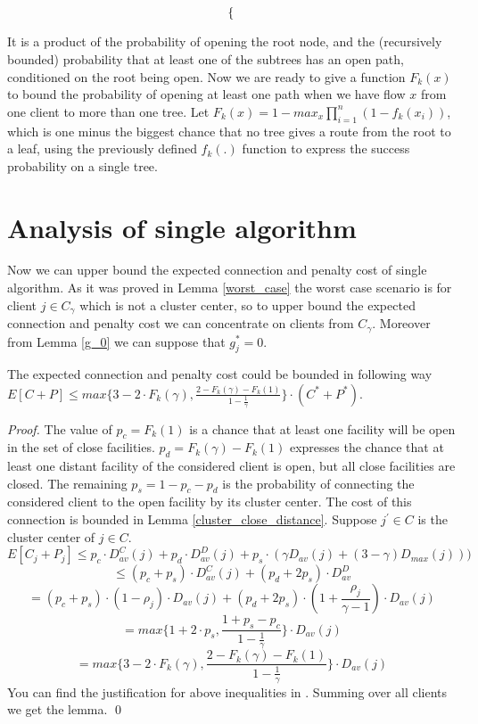\documentclass{llncs}
\begin{document}
\begin{appendix}
\[\begin{dcases*}
   \end{dcases*}
\]

It is a product of the probability of opening the root node, and the (recursively bounded) probability that at least one of the subtrees has an open path, conditioned on the root being open. Now we are ready to give a function $F_{k}(x)$ to bound the probability of opening at least one path when we have flow $x$ from one client to more than one tree. Let $F_{k}(x) = 1 - max_{x} \prod_{i = 1}^{n}(1 - f_{k}(x_{i}))$, which is one minus the biggest chance that no tree gives a route from the root to a leaf, using the previously defined $f_k(.)$ function to express the success probability on a single tree.

\section{Analysis of single algorithm}
\label{sec:single_algorithm}

Now we can upper bound the expected connection and penalty cost of single algorithm. As it was proved in Lemma \ref{worst_case} the worst case scenario is for client $j \in C_{\gamma}$ which is not a cluster center, so to upper bound the expected connection and penalty cost we can concentrate on clients from $C_{\gamma}$. Moreover from Lemma \ref{g_0} we can suppose that $g^*_j = 0$.

\begin{lemma}
 The expected connection and penalty cost could be bounded in following way $E[C+P] \leq max \{3 - 2 \cdot F_k(\gamma), \frac{2 - F_k(\gamma) - F_k(1)}{1 - \frac{1}{\gamma}}\} \cdot (C^* + P^*)$.
\end{lemma}

\begin{proof}
The value of $p_c = F_k(1)$ is a chance that at least one facility will be open in the set of close facilities. $p_d = F_k(\gamma) - F_k(1)$
expresses the chance that at least one distant facility of the considered client is open, but all close facilities are closed. The remaining $p_s=1-p_c-p_d$ is the probability of connecting the considered client to the open facility by its cluster center. The cost of this connection is bounded in Lemma \ref{cluster_close_distance}. Suppose $j^\prime\in C$ is the cluster center of $j\in C$.
$$E[C_j + P_j] \leq p_c \cdot D_{av}^{C}(j) + p_d \cdot D_{av}^{D}(j) + p_s \cdot (\gamma D_{av}(j) + (3 - \gamma)D_{max}(j)))$$
$$\leq (p_c + p_s) \cdot D_{av}^{C}(j) + (p_d + 2p_s) \cdot D_{av}^{D} $$
$$= (p_c + p_s) \cdot (1 - \rho_j) \cdot D_{av}(j) + (p_d + 2p_s) \cdot (1 + \frac{\rho_j}{\gamma - 1}) \cdot D_{av}(j)$$
$$= max \{1 + 2 \cdot p_s, \frac{1 + p_s - p_c}{1 - \frac{1}{\gamma}}\} \cdot D_{av}(j)$$
$$= max \{3 - 2 \cdot F_k(\gamma), \frac{2 - F_k(\gamma) - F_k(1)}{1 - \frac{1}{\gamma}}\} \cdot D_{av}(j)$$
You can find the justification for above inequalities in \cite{Ghodsi}. Summing over all clients we get the lemma.
\qed
\end{proof}
\end{appendix}
\end{document}
